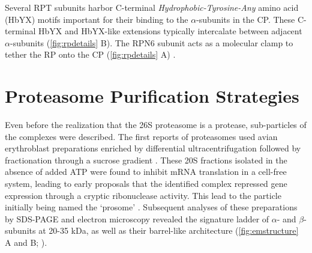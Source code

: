 Several RPT subunits harbor C-terminal \textit{Hydrophobic-Tyrosine-Any} amino acid (HbYX) motifs important for their binding to the $\alpha$-subunits in the CP. These C-terminal HbYX and HbYX-like extensions typically intercalate between adjacent $\alpha$-subunits (\ref{fig:rpdetails} B). The RPN6 subunit acts as a molecular clamp to tether the RP onto the CP (\ref{fig:rpdetails} A) \citep{pathare12}. 
	 
\section{Proteasome Purification Strategies}
	Even before the realization that the 26S proteasome is a protease, sub-particles of the complexes were described.  The first reports of proteasomes used avian erythroblast preparations enriched by differential ultracentrifugation followed by fractionation through a sucrose gradient \citep{schmid84}.  These 20S fractions isolated in the absence of added ATP were found to inhibit mRNA translation in a cell-free system, leading to early proposals that the identified complex repressed gene expression through a cryptic ribonuclease activity.  This lead to the particle initially being named the ‘prosome’ \citep{kremp86, schmid84}.  Subsequent analyses of these preparations by SDS-PAGE and electron microscopy revealed the signature ladder of $\alpha$- and $\beta$-subunits at 20-35 kDa, as well as their barrel-like architecture (\ref{fig:emstructure} A and B; \citep{baumeister88, kremp86, schmid84}).

